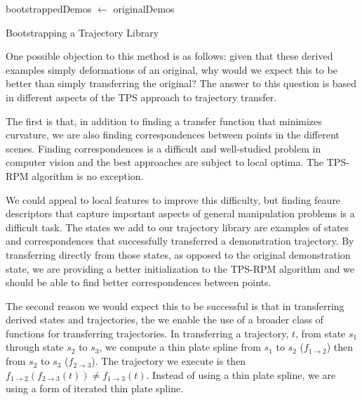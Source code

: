 \begin{algorithm}[H]

 bootstrappedDemos $\leftarrow$ originalDemos\;
 \caption{Bootstrapping a Trajectory Library}
 \label{alg:bootstrap}
\end{algorithm}

One possible objection to this method is as follows: given that these derived examples
simply deformations of an original, why would we expect this to be better than simply
transferring the original? The answer to this question is based in different
aspects of the TPS approach to trajectory transfer.

The first is that, in addition to finding a transfer function that minimizes curvature,
we are also finding correspondences between points in the different scenes. Finding 
correspondences is a difficult and well-studied problem in computer vision and the best
approaches are subject to local optima. The TPS-RPM algorithm is no exception. 

We could appeal to local features to improve this difficulty, but finding feaure descriptors 
that capture important aspects of general manipulation problems is a difficult task. The
states we add to our trajectory library are examples of states and correspondences that 
successfully transferred a demonstration trajectory. By transferring directly from those
states, as opposed to the original demonstration state, we are providing a better 
initialization to the TPS-RPM algorithm and we should be able to find better correspondences
between points.

The second reason we would expect this to be successful is that in transferring derived
states and trajectories, the we enable the use of a broader class of functions for 
transferring trajectories. In transferring a trajectory, $t$, from state $s_1$ through
state $s_2$ to $s_3$, we compute a thin plate spline from $s_1$ to $s_2$ 
($f_{1\rightarrow 2}$) then from $s_2$ to $s_3$ ($f_{2\rightarrow 3}$). The trajectory we
execute is then $f_{1\rightarrow 2}(f_{2\rightarrow 3}(t)) \ne f_{1\rightarrow 3}(t)$. 
Instead of using a thin plate spline, we are using a form of iterated thin plate spline.

